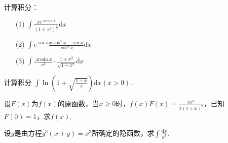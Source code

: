 \begin{xiti}
\item 计算积分：
\begin{enumerate}
	\item[(1)] $\int \frac { x e ^ { \arctan x } } { \left( 1 + x ^ { 2 } \right) ^ { \frac { 3 } { 2 } } } \mathrm { d } x$
	\item[(2)]  $\int e ^ { \sin x } \frac { x \cos ^ { 3 } x - \sin x } { \cos ^ { 2 } x }\mathrm{d}x$
	\item[(3)]  $\int \frac { \arcsin x } { x ^ { 2 } } \cdot \frac { 1 + x ^ { 2 } } { \sqrt { 1 - x ^ { 2 } } } \mathrm { d } x$
\end{enumerate}	
\item 计算积分
$\int \ln \left( 1 + \sqrt { \frac { 1 + x } { x } } \right) \mathrm { d } x ( x > 0 )$.
\item 设$F(x)$为$f(x)$的原函数，当$x\geq 0$时，$f ( x ) F ( x ) = \frac { x e ^ { x } } { 2 ( 1 + x ) ^ { 2 } }$，已知$F(0)=1$，求$f(x)$.
\item 设$y$是由方程$y ^ { 3 } ( x + y ) = x ^ { 3 }$所确定的隐函数，求$\int \frac {\mathrm{d}x } { y ^ { 3 } }$.
\end{xiti}



